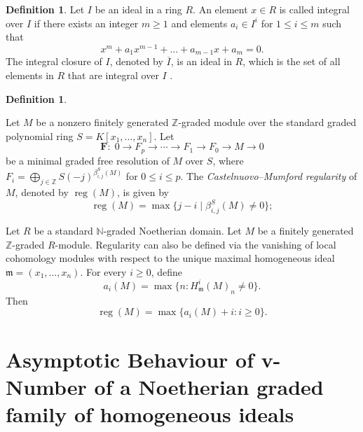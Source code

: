 \documentclass[11pt,reqno,a4paper]{amsart}
\theoremstyle{definition}
\newtheorem{definition}[theorem]{Definition}
\begin{document}
\begin{definition}
    

Let \(I\) be an ideal in a ring \(R\). An element \(x \in R\) is called integral over \(I\) if there exists an integer \(m \geq 1\) and elements \(a_i \in I^i\) for \(1 \leq i \leq m\) such that
\[
x^{m} + a_{1}x^{m - 1} + \dots +a_{m - 1}x + a_{m} = 0.
\]
The integral closure of \(I\), denoted by \(\overline{I}\), is an ideal in \(R\), which is the set of all elements in \(R\) that are integral over \(I\) .



\end{definition}



\begin{definition}\label{def:reg-pd-depth}


Let $M$ be a nonzero finitely generated $\mathbb{Z}$-graded module over the standard graded polynomial ring $S=K[x_1,\ldots,x_n]$. Let
\[
\mathbf{F}:\;0\to F_p\to\cdots\to F_1\to F_0\to M\to0
\]
be a minimal graded free resolution of $M$ over $S$, where
\(
F_i=\bigoplus_{j\in\mathbb{Z}}S(-j)^{\beta^S_{i,j}(M)}
\)
for $0\le i\le p$. The \emph{Castelnuovo--Mumford regularity} of $M$, denoted by $\operatorname{reg}(M)$, is given by
\[
\operatorname{reg}(M)=\max\{j-i\mid\beta^S_{i,j}(M)\ne0\};
\]
    

\noindent Let $R$  be a standard $\mathbb{N}$-graded Noetherian domain. Let $M$ be a finitely generated $\mathbb{Z}$-graded $R$-module. Regularity can also be defined via the vanishing of local cohomology modules with respect to the unique maximal homogeneous ideal
\(
\mathfrak{m} = (x_1,\ldots,x_n).
\)
For every $i\geq 0$, define
\[
a_i(M)
=
\max\{n:H_{\mathfrak{m}}^i(M)_n\neq 0\}.
\]
Then
\[
\operatorname{reg}(M)
=
\max\{a_i(M)+i:i\geq 0\}.
\]








\end{definition}
















\section{Asymptotic Behaviour of v-Number of a Noetherian graded family of homogeneous ideals}\label{secgradedconjonv}
\end{document}

